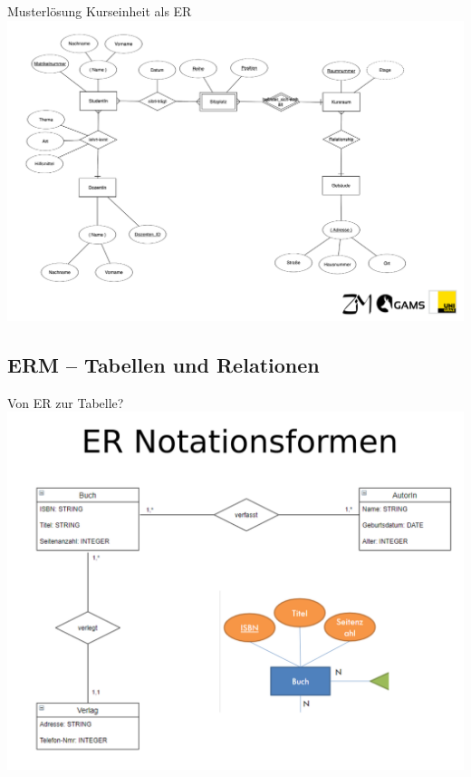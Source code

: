 \begin{frame}{Musterlösung Kurseinheit als ER}
    \includegraphics[width=\textwidth]{img/wdh-er-kursmodellierung.png}
\end{frame}


\subsection{ERM -- Tabellen und Relationen}

\begin{frame}{Von ER zur Tabelle?}
    \includegraphics[width=\textwidth]{img/er-notation-buch.png}
\end{frame}

